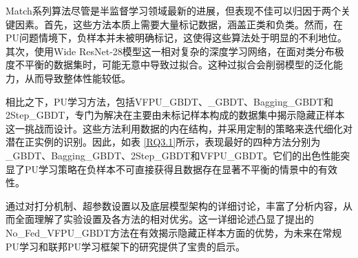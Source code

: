 Match系列算法尽管是半监督学习领域最新的进展，但表现不佳可以归因于两个关键因素。首先，这些方法本质上需要大量标记数据，涵盖正类和负类。然而，在PU问题情境下，负样本并未被明确标记，这使得这些算法处于明显的不利地位。其次，使用Wide ResNet-28模型这一相对复杂的深度学习网络，在面对类分布极度不平衡的数据集时，可能无意中导致过拟合。这种过拟合会削弱模型的泛化能力，从而导致整体性能较低。

相比之下，PU学习方法，包括VFPU\_GBDT、\_GBDT、Bagging\_GBDT和2Step\_GBDT，专门为解决在主要由未标记样本构成的数据集中揭示隐藏正样本这一挑战而设计。这些方法利用数据的内在结构，并采用定制的策略来迭代细化对潜在正实例的识别。因此，如表 \ref{RQ3.1}所示，表现最好的四种方法分别为\_GBDT、Bagging\_GBDT、2Step\_GBDT和VFPU\_GBDT。它们的出色性能突显了PU学习策略在负样本不可直接获得且数据存在显著不平衡的情景中的有效性。

通过对打分机制、超参数设置以及底层模型架构的详细讨论，丰富了分析内容，从而全面理解了实验设置及各方法的相对优劣。这一详细论述凸显了提出的No\_Fed\_VFPU\_GBDT方法在有效揭示隐藏正样本方面的优势，为未来在常规PU学习和联邦PU学习框架下的研究提供了宝贵的启示。


